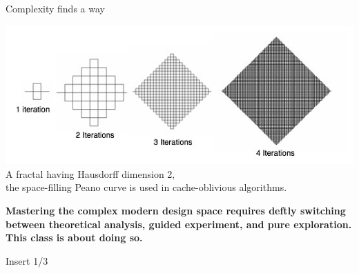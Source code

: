 \documentclass[mathserif,xcolor={dvipsnames,table}]{beamer}
\begin{document}
\begin{frame}{Complexity finds a way}
\begin{center}
\includegraphics[width=\textwidth]{images/peano.jpg}\\
\tiny{A fractal having Hausdorff dimension 2,\\
the space-filling Peano curve is used in cache-oblivious algorithms.}
\end{center}
\vfill
\large{\textbf{Mastering the complex modern design space requires deftly
switching between theoretical analysis, guided experiment, and pure
exploration.\\
\vspace{.25in}
This class is about doing so.}}
\end{frame}

{
%
\begin{frame}{Insert 1/3}
\end{frame}
}
\end{document}
